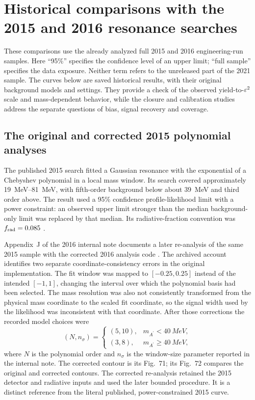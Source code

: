 \section{Historical comparisons with the 2015 and 2016 resonance searches}
\label{app:v501-published-comparisons}

These comparisons use the already analyzed full 2015 and 2016 engineering-run
samples. Here ``95\%'' specifies the confidence level of an upper limit;
``full sample'' specifies the data exposure. Neither term refers to the
unreleased part of the 2021 sample. The curves below are saved historical
results, with their original background models and settings. They provide a
check of the observed yield-to-$\varepsilon^2$ scale and mass-dependent behavior,
while the closure and calibration studies address the separate questions
of bias, signal recovery and coverage.

\subsection{The original and corrected 2015 polynomial analyses}
\label{sec:v501-2015-polynomial-history}

The published 2015 search fitted a Gaussian resonance with the
exponential of a Chebyshev polynomial in a local mass window. Its search covered
approximately \SIrange{19}{81}{MeV}, with fifth-order background below
about \SI{39}{MeV} and third order above. The result used a 95\% confidence
profile-likelihood limit with a power constraint: an observed upper limit
stronger than the median background-only limit was replaced by that
median. Its radiative-fraction convention was $f_{\rm rad}=0.085$
\cite{HPS2015DarkPhoton,HPS2015InternalNote}.

Appendix~J of the 2016 internal note documents a later re-analysis of the
same 2015 sample with the corrected 2016 analysis code
\cite{HPS2016BumpInternal}. The archived account identifies two separate
coordinate-consistency errors in the original implementation. The fit
window was mapped to $[-0.25,0.25]$ instead of the intended $[-1,1]$,
changing the interval over which the polynomial basis had been selected.
The mass resolution was also not consistently transformed from the
physical mass coordinate to the scaled fit coordinate, so the signal
width used by the likelihood was inconsistent with that coordinate.
After those corrections the recorded model choices were
\begin{equation}
 (N,n_\sigma)=
 \begin{cases}
 (5,10),&m_{A^\prime}<\SI{40}{MeV},\\
 (3,8),&m_{A^\prime}\geq\SI{40}{MeV},
 \end{cases}
 \label{eq:v501-corrected-2015-window}
\end{equation}
where $N$ is the polynomial order and $n_\sigma$ is the window-size
parameter reported in the internal note. The corrected contour is its
Fig.~71; its Fig.~72 compares the original and corrected contours.
The corrected re-analysis retained the 2015 detector and radiative inputs
and used the later bounded \CLs{} procedure. It is a distinct reference
from the literal published, power-constrained 2015 curve.

